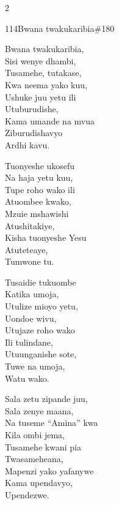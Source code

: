 \begin{multicols}{2}
\begin{hymn}{114}{Bwana twakukaribia}{\#180}
\begin{stanza}
Bwana twakukaribia,\\
Sisi wenye dhambi,\\
Tusamehe, tutakase,\\
Kwa neema yako kuu,\\
Ushuke juu yetu ili\\
Utuburudishe,\\
Kama umande na mvua\\
Ziburudishavyo\\
Ardhi kavu.
\end{stanza}
\begin{stanza}
Tuonyeshe ukosefu\\
Na haja yetu kuu,\\
Tupe roho wako ili\\
Atuombee kwako,\\
Mzuie mshawishi\\
Atushitakiye,\\
Kisha tuonyeshe Yesu\\
Atuteteaye,\\
Tumwone tu.
\end{stanza}
\begin{stanza}
Tusaidie tukuombe\\
Katika umoja,\\
Utulize mioyo yetu,\\
Uondoe wivu,\\
Utujaze roho wako\\
Ili tulindane,\\
Utuunganishe sote,\\
Tuwe na umoja,\\
Watu wako.
\end{stanza}
\begin{stanza}
Sala zetu zipande juu,\\
Sala zenye maana,\\
Na tuseme ``Amina'' kwa\\
Kila ombi jema,\\
Tusamehe kwani pia\\
Twasameheana,\\
Mapenzi yako yafanywe\\
Kama upendavyo,\\
Upendezwe.
\end{stanza}
\end{hymn}


\end{multicols}
